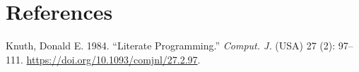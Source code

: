 \documentclass[
  letterpaper,
  DIV=11,
  numbers=noendperiod]{scrreprt}
\newlength{\cslhangindent}
\newenvironment{CSLReferences}[2] %
 {\begin{list}{}{%
  \setlength{\itemindent}{0pt}
  \setlength{\leftmargin}{0pt}
  \setlength{\parsep}{0pt}
  \ifodd #1
   \setlength{\leftmargin}{\cslhangindent}
   \setlength{\itemindent}{-1\cslhangindent}
  \fi
  \setlength{\itemsep}{#2\baselineskip}}}
 {\end{list}}
\begin{document}

\chapter*{References}\label{references}


\protect{}\label{refs}
\begin{CSLReferences}{1}{1}
Knuth, Donald E. 1984. {``Literate Programming.''} \emph{Comput. J.}
(USA) 27 (2): 97--111. \url{https://doi.org/10.1093/comjnl/27.2.97}.

\end{CSLReferences}
\end{document}
